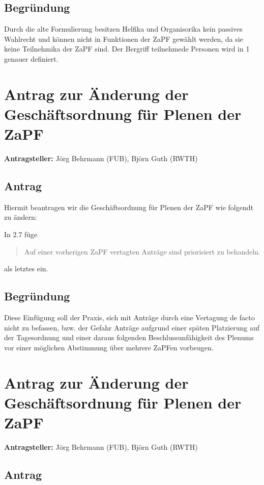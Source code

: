 \documentclass[draft,10pt,oneside]{scrartcl}
\begin{document}
\subsection*{Begründung}
Durch die alte Formulierung besitzen Helfika und Organisorika kein passives
Wahlrecht und können nicht in Funktionen der ZaPF gewählt werden, da sie keine
Teilnehmika der ZaPF sind. Der Bergriff \glqq{}teilnehmede Personen\grqq{} wird
in 1 genauer definiert.

\newpage

\section*{Antrag zur Änderung der Geschäftsordnung für Plenen der ZaPF}

\textbf{Antragsteller:} Jörg Behrmann (FUB), Björn Guth (RWTH)

\subsection*{Antrag}

Hiermit beantragen wir die Geschäftsordnung für Plenen der ZaPF wie folgendt zu ändern:

In 2.7 füge
\begin{quote}
	Auf einer vorherigen ZaPF vertagten Anträge sind priorisiert zu behandeln.
\end{quote}
als letztes ein.

\subsection*{Begründung}
Diese Einfügung soll der Praxis, sich mit Anträge durch eine Vertagung de facto
nicht zu befassen, bzw. der Gefahr Anträge aufgrund einer späten Platzierung auf
der Tagesordnung und einer daraus folgenden Beschlussunfähigkeit des Plenums vor
einer möglichen Abstimmung über mehrere ZaPFen vorbeugen.

\newpage

\section*{Antrag zur Änderung der Geschäftsordnung für Plenen der ZaPF}

\textbf{Antragsteller:} Jörg Behrmann (FUB), Björn Guth (RWTH)

\subsection*{Antrag}
\end{document}
